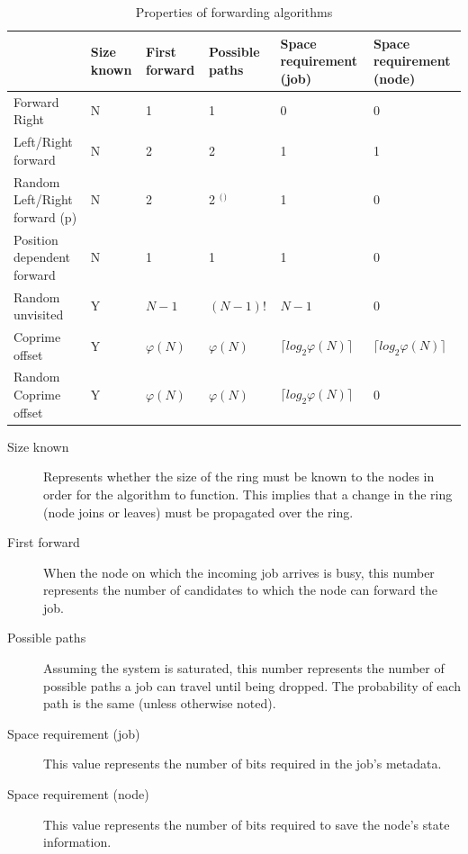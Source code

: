 \documentclass[10pt,a4paper]{article}
\begin{document}
\begin{table}[h!]
\hspace{-0.12\textwidth}
\begin{tabular}{|p{}|p{}|p{}|p{}|p{}|p{}|} \cline{2-6}
\multicolumn{1}{l|}{}		& Size known	& First forward	& Possible paths	& Space requirement (job)	& Space requirement (node) \\ \hline
Forward Right				& N				& 1				& 1					& 0							& 0		\\ \hline
Left/Right forward			& N				& 2				& 2					& 1							& 1		\\ \hline
Random Left/Right forward (p) & N			& 2				& 2 $^($\footnotemark$^)$ & 1					& 0		\\ \hline
Position dependent forward	& N				& 1				& 1					& 1							& 0		\\ \hline
Random unvisited			& Y				& $N-1$			& $(N-1)!$			& $N-1$	& 0		\\ \hline
Coprime offset				& Y				& $\varphi(N)$		& $\varphi(N)$ 		& $\lceil log_2 \varphi(N) \rceil$	& $\lceil log_2 \varphi(N) \rceil$ \\ \hline
Random Coprime offset		& Y				& $\varphi(N)$		& $\varphi(N)$			& $\lceil log_2 \varphi(N) \rceil$	& 0		\\ \hline
\end{tabular}
\caption{Properties of forwarding algorithms}
\label{tabprops}
\end{table}

\begin{description}
\item[Size known] Represents whether the size of the ring must be known to the nodes in order for the algorithm to function. This implies that a change in the ring (node joins or leaves) must be propagated over the ring.
\item[First forward] When the node on which the incoming job arrives is busy, this number represents the number of candidates to which the node can forward the job.
\item[Possible paths] Assuming the system is saturated, this number represents the number of possible paths a job can travel until being dropped. The probability of each path is the same (unless otherwise noted).
\item[Space requirement (job)] This value represents the number of bits required in the job's metadata.
\item[Space requirement (node)] This value represents the number of bits required to save the node's state information.
\end{description}
\end{document}
